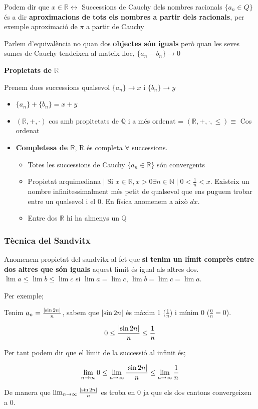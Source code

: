 \documentclass[12pt]{article}
\newcommand{\R}{\mathbb{R}}
\newcommand{\N}{\mathbb{N}}
\newcommand{\Q}{\mathbb{Q}}
\begin{document}
    Podem dir que $x \in \R \leftrightarrow$ Successions de Cauchy dels nombres racionals $\{a_n \in Q\}$ és a dir \textbf{aproximacions de tots els nombres a partir dels racionals}, per exemple aproximació de $\pi$ a partir de Cauchy

    Parlem d'equivalència no quan dos \textbf{objectes són iguals} però quan les seves sumes de Cauchy tendeixen al mateix lloc, $\{a_n - b_n\} \rightarrow 0$

    \textbf{Propietats de $\R$}

    Prenem dues successions qualsevol $\{a_n\} \rightarrow x$ i $\{b_n\} \rightarrow y$

    \begin{itemize}
        \item $\{a_n\} + \{b_n\} = x+y$
        \item $(\R, +, \cdot)$ cos amb propitetats de $\Q$ i a més ordenat = $(\R, +, \cdot, \leq) \equiv $ Cos ordenat
        \item \textbf{Completesa de $\R$}, R és completa $\forall$ successions.
        \begin{itemize}
            \item Totes les successions de Cauchy $\{a_n \in \R\}$ són convergents
            \item Propietat arquimediana $\mid$ Si $x\in\R, x > 0 \exists n\in \N \mid 0<\frac{1}{n}<x$. Existeix un nombre infinitessimalment més petit de qualsevol que ens puguem trobar entre un qualsevol i el 0. En física anomenem a això $dx$.
            \item Entre dos $\R$ hi ha almenys un $\Q$
        \end{itemize}
    \end{itemize}

    \subsubsection{Tècnica del Sandvitx}

    Anomenem propietat del sandvitx al fet que \textbf{si tenim un límit comprès entre dos altres que són iguals} aquest límit és igual als altres dos. $\lim a \leq \lim b \leq \lim c$ si $\lim a = \lim c$, $\lim b = \lim c = \lim a$.

    Per exemple;

    \begin{examplebox}{}
        Tenim $a_n = \frac{\abs{\sin 2n}}{n}$, sabem que $\abs{\sin 2n}$ és màxim 1 ($\frac{1}{n}$) i mínim 0 ($\frac{0}{n} = 0$). 
        
        \[0 \leq \frac{\abs{\sin 2n}}{n} \leq \frac{1}{n}\]

        Per tant podem dir que el límit de la successió al infinit és;

        \[\lim_{n\rightarrow \infty}0 \leq \lim_{n\rightarrow \infty} \frac{\abs{\sin 2n}}{n} \leq \lim_{n\rightarrow \infty} \frac{1}{n}\]

        De manera que $\lim_{n\rightarrow \infty} \frac{\abs{\sin 2n}}{n}$ es troba en 0 ja que els dos cantons convergeixen a 0.

    \end{examplebox}
\end{document}
